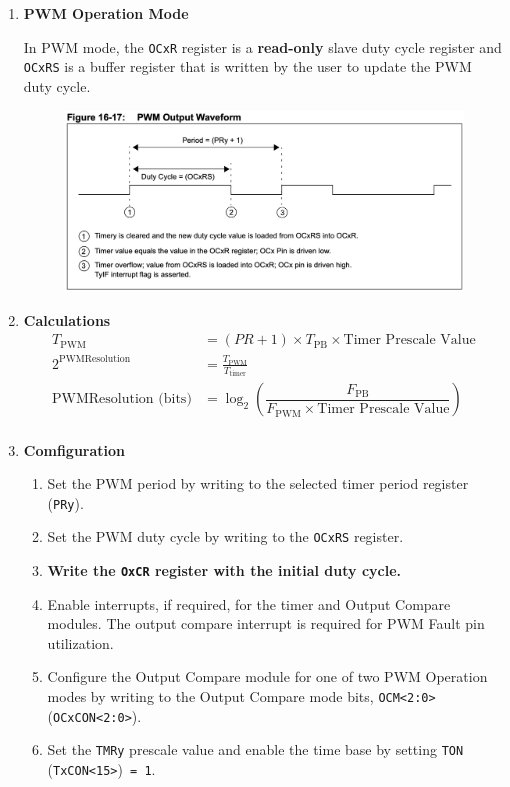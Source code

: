 \documentclass[a4paper]{article}
\begin{document}
\begin{enumerate}[label = \arabic*.]
    \item \textbf{PWM Operation Mode}
      \par In PWM mode, the \verb|OCxR| register is a \textbf{read-only} slave duty cycle register and \verb|OCxRS| is a buffer register that is written by the user to update the PWM duty cycle.

      \begin{figure}[H]
        \centering
        \includegraphics[width=0.8\linewidth]{PWM_output_waveform.png}
        \label{fig:PWM_output_waveform.png}
      \end{figure}

    \item \textbf{Calculations}
      \begin{equation*}
        \begin{aligned}
          T_{\text{PWM}}                      & = (PR + 1) \times T_{\text{PB}}  \times \text{Timer Prescale Value}                                \\
          2^{\text{PWMResolution}}            & = \frac{T_{\text{PWM}}}{T_{\text{timer}} }                                                         \\
          \text{PWMResolution} \text{ (bits)} & = \log_2 \left( \dfrac{F_{\text{PB}} }{F_{\text{PWM}} \times \text{Timer Prescale Value}}  \right) \\
        \end{aligned}
      \end{equation*}

    \item \textbf{Comfiguration}
      \begin{enumerate}[label = \arabic*.]
        \item Set the PWM period by writing to the selected timer period register (\verb|PRy|).
        \item Set the PWM duty cycle by writing to the \verb|OCxRS| register.
        \item \cprotect\textbf{Write the \verb|OxCR| register with the initial duty cycle.}
        \item Enable interrupts, if required, for the timer and Output Compare modules. The output compare interrupt is required for PWM Fault pin utilization.
        \item Configure the Output Compare module for one of two PWM Operation modes by writing to the Output Compare mode bits, \verb|OCM<2:0>| (\verb|OCxCON<2:0>|).
        \item Set the \verb|TMRy| prescale value and enable the time base by setting \verb|TON| (\verb|TxCON<15>|)\verb| = 1|.
      \end{enumerate}
  \end{enumerate}
\end{document}
